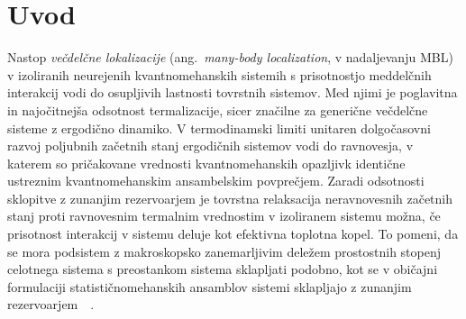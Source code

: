 \chapter{Uvod}
Nastop \emph{večdelčne lokalizacije} (ang.~\emph{many-body localization}, v nadaljevanju MBL) v izoliranih neurejenih kvantnomehanskih sistemih s prisotnostjo meddelčnih interakcij vodi do osupljivih lastnosti tovrstnih sistemov. Med njimi je poglavitna in najočitnejša odsotnost termalizacije, sicer značilne za generične večdelčne sisteme z ergodično dinamiko. V termodinamski limiti unitaren dolgočasovni razvoj poljubnih začetnih stanj ergodičnih sistemov vodi do ravnovesja, v katerem so pričakovane vrednosti kvantnomehanskih opazljivk identične ustreznim kvantnomehanskim ansambelskim povprečjem. Zaradi odsotnosti sklopitve z zunanjim rezervoarjem je tovrstna relaksacija neravnovesnih začetnih stanj proti ravnovesnim termalnim vrednostim v izoliranem sistemu možna, če prisotnost interakcij v sistemu deluje kot efektivna toplotna kopel. To pomeni, da se mora podsistem z makroskopsko zanemarljivim deležem prostostnih stopenj  celotnega sistema s preostankom sistema sklapljati podobno, kot se v običajni formulaciji statističnomehanskih ansamblov sistemi sklapljajo z zunanjim rezervoarjem~\cite{abanin2018ergodicity}~\cite{nandkishore2015many}. \\\\
